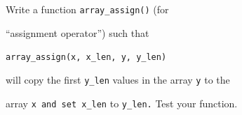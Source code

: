 Write a function \texttt{array\_assign()} (for

``assignment operator'') such that

\texttt{array\_assign(x, x\_len, y, y\_len)}



will copy the first \texttt{y\_len} values in the array \texttt{y} to the

array \texttt{x and set x\_len} to \texttt{y\_len.} Test your function.

